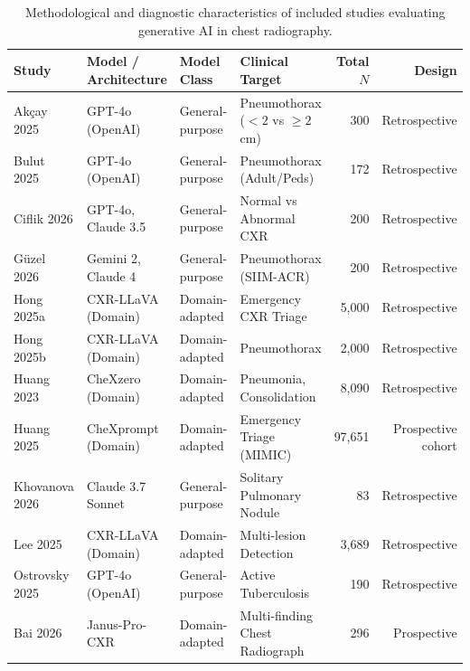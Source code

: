 \documentclass[preprint,11pt]{elsarticle}
\begin{document}
\begin{table}[htbp]
\centering
\small
\caption{Methodological and diagnostic characteristics of included studies evaluating generative AI in chest radiography.}
\label{tab:studies}
\begin{tabularx}{\textwidth}{l p{2.2cm} p{2.0cm} p{2.8cm} r r}
\toprule
\textbf{Study} & \textbf{Model / Architecture} & \textbf{Model Class} & \textbf{Clinical Target} & \textbf{Total $N$} & \textbf{Design} \\
\midrule
Ak\c{c}ay 2025 \cite{akcay} & GPT-4o (OpenAI) & General-purpose & Pneumothorax ($<2$ vs $\ge 2$ cm) & 300 & Retrospective \\
Bulut 2025 \cite{bulut} & GPT-4o (OpenAI) & General-purpose & Pneumothorax (Adult/Peds) & 172 & Retrospective \\
Ciflik 2026 \cite{ciflik} & GPT-4o, Claude 3.5 & General-purpose & Normal vs Abnormal CXR & 200 & Retrospective \\
G\"uzel 2026 \cite{guzel} & Gemini 2, Claude 4 & General-purpose & Pneumothorax (SIIM-ACR) & 200 & Retrospective \\
Hong 2025a \cite{hong2025a} & CXR-LLaVA (Domain) & Domain-adapted & Emergency CXR Triage & 5,000 & Retrospective \\
Hong 2025b \cite{hong2025b} & CXR-LLaVA (Domain) & Domain-adapted & Pneumothorax & 2,000 & Retrospective \\
Huang 2023 \cite{huang2023} & CheXzero (Domain) & Domain-adapted & Pneumonia, Consolidation & 8,090 & Retrospective \\
Huang 2025 \cite{huang2025} & CheXprompt (Domain) & Domain-adapted & Emergency Triage (MIMIC) & 97,651 & Prospective cohort \\
Khovanova 2026 \cite{khovanova} & Claude 3.7 Sonnet & General-purpose & Solitary Pulmonary Nodule & 83 & Retrospective \\
Lee 2025 \cite{lee} & CXR-LLaVA (Domain) & Domain-adapted & Multi-lesion Detection & 3,689 & Retrospective \\
Ostrovsky 2025 \cite{ostrovsky} & GPT-4o (OpenAI) & General-purpose & Active Tuberculosis & 190 & Retrospective \\
Bai 2026 \cite{bai} & Janus-Pro-CXR & Domain-adapted & Multi-finding Chest Radiograph & 296 & Prospective \\
\bottomrule
\end{tabularx}
\end{table}
\end{document}
